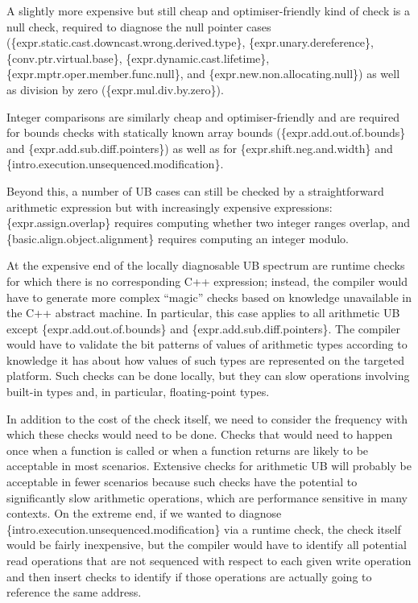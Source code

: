 A slightly more expensive but still cheap and optimiser-friendly kind of check is a null check, required to diagnose the null pointer cases  
(\{expr.static.cast.downcast.wrong.derived.type\},
\{expr.unary.deref\-erence\},
\{conv.ptr.virtual.base\},
\{expr.dynamic.cast.lifetime\}, 
\{expr.mptr.oper.member.\linebreak[3]func.null\}, and
\{expr.new.non.allocating.null\})
as well as division by zero (\{expr.mul.div.by.zero\}).

Integer comparisons are similarly cheap and optimiser-friendly and are   required for bounds checks with statically known array bounds
(\{expr.add.out.of.bounds\} and
\{expr.add.sub.diff.pointers\})
as well as for \{expr.shift.neg.and.width\} 
and \{intro.execution.unsequenced.modification\}.

Beyond this, a number of UB cases can still be checked by a straightforward arithmetic expression but with increasingly expensive expressions: \{expr.assign.overlap\} requires computing whether two integer ranges overlap, and  \{basic.align.object.alignment\} requires computing an integer modulo. 

At the expensive end of the locally diagnosable UB spectrum are runtime checks for which there is no corresponding C++ expression; instead, the compiler would have to generate more complex ``magic'' checks based on knowledge unavailable in the C++ abstract machine. In particular, this case applies to all arithmetic UB except \{expr.add.out.of.bounds\} and
\{expr.add.sub.diff.pointers\}. The compiler would have to validate the bit patterns of values of arithmetic types according to knowledge it has about how values of such types are represented on the targeted platform. Such checks can be done locally, but they can slow operations involving built-in types and, in particular, floating-point types.

In addition to the cost of the check itself, we need to consider the frequency with which these checks would need to be done. Checks that would need to happen once when a function is called or when a function returns are likely to be acceptable in most scenarios. Extensive checks for arithmetic UB will probably be acceptable in fewer scenarios because such checks have the potential to significantly slow arithmetic operations, which are performance sensitive in many contexts. On the extreme end, if we wanted to diagnose \{intro.execution.unsequenced.modification\} via a runtime check, the check itself would be fairly inexpensive, but the compiler would have to identify all potential read operations that are not sequenced with respect to each given write operation and then insert checks to identify if those operations are actually going to reference the same address.

